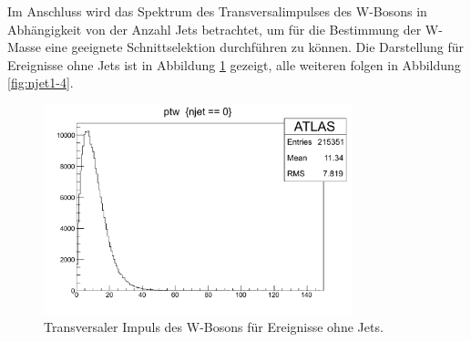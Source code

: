 \documentclass[11pt, a4paper]{article}
\numberwithin{equation}{section}
\begin{document}
Im Anschluss wird das Spektrum des Transversalimpulses des W-Bosons in Abhängigkeit von der Anzahl Jets betrachtet, um für die Bestimmung der W-Masse eine geeignete Schnittselektion durchführen zu können.
Die Darstellung für Ereignisse ohne Jets ist in Abbildung \ref{fig:njet0} gezeigt, alle weiteren folgen in Abbildung \ref{fig:njet1-4}.
\begin{figure}[h]
	\centering
	\includegraphics[width=0.8\textwidth]{./data/root/wmass/exercise2/njet0}
	\caption{Transversaler Impuls des W-Bosons für Ereignisse ohne Jets.}
	\label{fig:njet0}
\end{figure}
\end{document}
